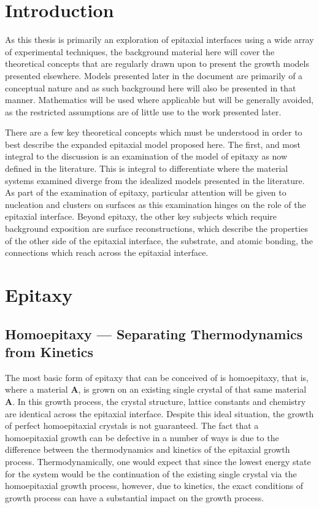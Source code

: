 \section{Introduction}
As this thesis is primarily an exploration of epitaxial interfaces using a wide array of experimental techniques, the background material here will cover the theoretical concepts that are regularly drawn upon to present the growth models presented elsewhere. Models presented later in the document are primarily of a conceptual nature and as such background here will also be presented in that manner. Mathematics will be used where applicable but will be generally avoided, as the restricted assumptions are of little use to the work presented later.

There are a few key theoretical concepts which must be understood in order to best describe the expanded epitaxial model proposed here. The first, and most integral to the discussion is an examination of the model of epitaxy as now defined in the literature. This is integral to differentiate where the material systems examined diverge from the idealized models presented in the literature. As part of the examination of epitaxy, particular attention will be given to nucleation and clusters on surfaces as this examination hinges on the role of the epitaxial interface. Beyond epitaxy, the other key subjects which require background exposition are surface reconstructions, which describe the properties of the other side of the epitaxial interface, the substrate, and atomic bonding, the connections which reach across the epitaxial interface.

\section{Epitaxy}
\subsection{Homoepitaxy --- Separating Thermodynamics from Kinetics}
The most basic form of epitaxy that can be conceived of is homoepitaxy, that is, where a material \textbf{A}, is grown on an existing single crystal of that same material \textbf{A}. In this growth process, the crystal structure, lattice constants and chemistry are identical across the epitaxial interface. Despite this ideal situation, the growth of perfect homoepitaxial crystals is not guaranteed. The fact that a homoepitaxial growth can be defective in a number of ways is due to the difference between the thermodynamics and kinetics of the epitaxial growth process. Thermodynamically, one would expect that since the lowest energy state for the system would be the continuation of the existing single crystal via the homoepitaxial growth process, however, due to kinetics, the exact conditions of growth process can have a substantial impact on the growth process.

